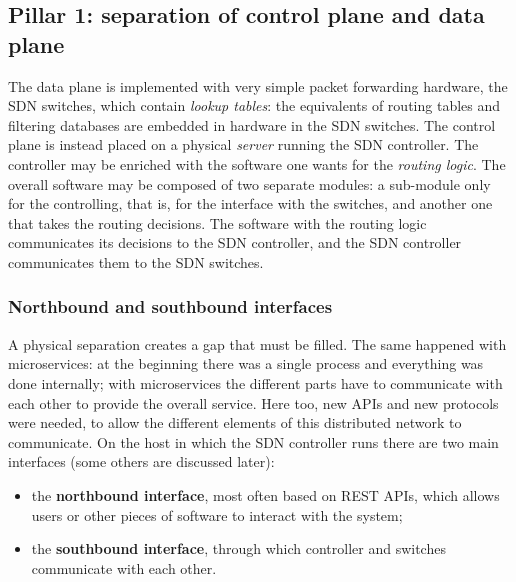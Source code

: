\subsection{Pillar 1: separation of control plane and data plane}

The data plane is implemented with very simple packet forwarding hardware, the SDN switches, which contain \emph{lookup tables}: the equivalents of routing tables and filtering databases are embedded in hardware in the SDN switches. The control plane is instead placed on a physical \emph{server} running the SDN controller. The controller may be enriched with the software one wants for the \emph{routing logic}. The overall software may be composed of two separate modules: a sub-module only for the controlling, that is, for the interface with the switches, and another one that takes the routing decisions. The software with the routing logic communicates its decisions to the SDN controller, and the SDN controller communicates them to the SDN switches.

\begin{center}
\end{center}

\subsubsection*{Northbound and southbound interfaces}

A physical separation creates a gap that must be filled. The same happened with microservices: at the beginning there was a single process and everything was done internally; with microservices the different parts have to communicate with each other to provide the overall service. Here too, new APIs and new protocols were needed, to allow the different elements of this distributed network to communicate. On the host in which the SDN controller runs there are two main interfaces (some others are discussed later):

\begin{itemize}
\item the \textbf{northbound interface}, most often based on REST APIs, which allows users or other pieces of software to interact with the system;
\item the \textbf{southbound interface}, through which controller and switches communicate with each other.
\end{itemize}

